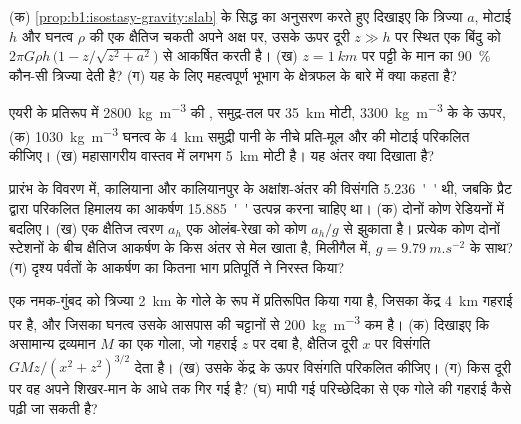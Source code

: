 \begin{exercise}[$\star\star$]\label{exo:b1:isostasy-gravity:7}
(क) \cref{prop:b1:isostasy-gravity:slab} के सिद्ध का अनुसरण करते हुए दिखाइए कि त्रिज्या $a$, मोटाई $h$ और घनत्व $\rho$ की एक क्षैतिज चकती अपने अक्ष पर, उसके ऊपर दूरी $z \gg h$ पर स्थित एक बिंदु को $2\pi G\rho h\,\bigl(1 -
z/\sqrt{z^2 + a^2}\bigr)$ से आकर्षित करती है। (ख) $z = \qty{1}{km}$ पर पट्टी के मान का \qty{90}{\percent} कौन-सी त्रिज्या देती है? (ग) यह  के लिए महत्वपूर्ण भूभाग के क्षेत्रफल के बारे में क्या कहता है?
\end{exercise}

\begin{exercise}[$\star\star$]\label{exo:b1:isostasy-gravity:8}
एयरी के प्रतिरूप में \qty{2800}{kg.m^{-3}} की , समुद्र-तल पर \qty{35}{km} मोटी, \qty{3300}{kg.m^{-3}} के  के ऊपर, (क) \qty{1030}{kg.m^{-3}} घनत्व के \qty{4}{km} समुद्री पानी के नीचे प्रति-मूल और  की मोटाई परिकलित कीजिए। (ख) महासागरीय  वास्तव में लगभग \qty{5}{km} मोटी है। यह अंतर क्या दिखाता है? %
\end{exercise}

\begin{exercise}[$\star\star$]\label{exo:b1:isostasy-gravity:9}
प्रारंभ के विवरण में, कालियाना और कालियानपुर के अक्षांश-अंतर की विसंगति \qty{5.236}{''} थी, जबकि प्रैट द्वारा परिकलित हिमालय का आकर्षण \qty{15.885}{''} उत्पन्न करना चाहिए था। (क) दोनों कोण रेडियनों में बदलिए। (ख) एक क्षैतिज त्वरण $a_h$ एक ओलंब-रेखा को कोण $a_h/g$ से झुकाता है। प्रत्येक कोण दोनों स्टेशनों के बीच क्षैतिज आकर्षण के किस अंतर से मेल खाता है, मिलीगैल में, $g = \qty{9.79}{m.s^{-2}}$ के साथ? (ग) दृश्य पर्वतों के आकर्षण का कितना भाग प्रतिपूर्ति ने निरस्त किया?
\end{exercise}

\begin{exercise}[$\star\star\star$]\label{exo:b1:isostasy-gravity:10}
एक नमक-गुंबद को त्रिज्या \qty{2}{km} के गोले के रूप में प्रतिरूपित किया गया है, जिसका केंद्र \qty{4}{km} गहराई पर है, और जिसका घनत्व उसके आसपास की चट्टानों से \qty{200}{kg.m^{-3}} कम है। (क) दिखाइए कि असामान्य द्रव्यमान $M$ का एक गोला, जो गहराई $z$ पर दबा है, क्षैतिज दूरी $x$ पर विसंगति $GMz/(x^2 + z^2)^{3/2}$ देता है। (ख) उसके केंद्र के ऊपर विसंगति परिकलित कीजिए। (ग) किस दूरी पर वह अपने शिखर-मान के आधे तक गिर गई है? (घ) मापी गई परिच्छेदिका से एक गोले की गहराई कैसे पढ़ी जा सकती है?
\end{exercise}

